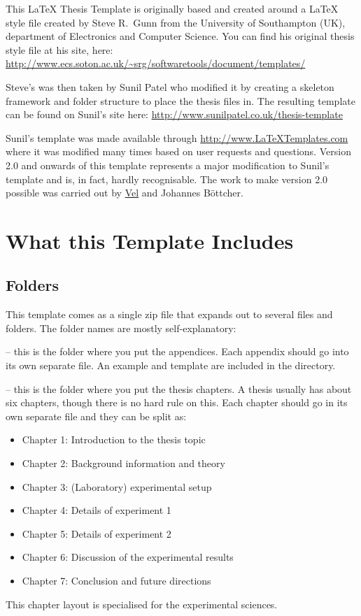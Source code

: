 This \LaTeX{} Thesis Template is originally based and created around a \LaTeX{} style file created by Steve R.\ Gunn from the University of Southampton (UK), department of Electronics and Computer Science. You can find his original thesis style file at his site, here:
\url{http://www.ecs.soton.ac.uk/~srg/softwaretools/document/templates/}

Steve's  was then taken by Sunil Patel who modified it by creating a skeleton framework and folder structure to place the thesis files in. The resulting template can be found on Sunil's site here:
\url{http://www.sunilpatel.co.uk/thesis-template}

Sunil's template was made available through \url{http://www.LaTeXTemplates.com} where it was modified many times based on user requests and questions. Version 2.0 and onwards of this template represents a major modification to Sunil's template and is, in fact, hardly recognisable. The work to make version 2.0 possible was carried out by \href{mailto:vel@latextemplates.com}{Vel} and Johannes Böttcher.


\section{What this Template Includes}

\subsection{Folders}

This template comes as a single zip file that expands out to several files and folders. The folder names are mostly self-explanatory:

 -- this is the folder where you put the appendices. Each appendix should go into its own separate  file. An example and template are included in the directory.

 -- this is the folder where you put the thesis chapters. A thesis usually has about six chapters, though there is no hard rule on this. Each chapter should go in its own separate  file and they can be split as:
\begin{itemize}
\item Chapter 1: Introduction to the thesis topic
\item Chapter 2: Background information and theory
\item Chapter 3: (Laboratory) experimental setup
\item Chapter 4: Details of experiment 1
\item Chapter 5: Details of experiment 2
\item Chapter 6: Discussion of the experimental results
\item Chapter 7: Conclusion and future directions
\end{itemize}
This chapter layout is specialised for the experimental sciences.


